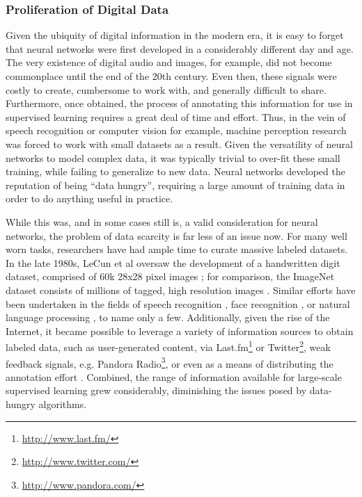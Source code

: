 \subsubsection{Proliferation of Digital Data}
\label{subsec:perceptrons}

Given the ubiquity of digital information in the modern era, it is easy to forget that neural networks were first developed in a considerably different day and age.
The very existence of digital audio and images, for example, did not become commonplace until the end of the 20th century.
Even then, these signals were costly to create, cumbersome to work with, and generally difficult to share.
Furthermore, once obtained, the process of annotating this information for use in supervised learning requires a great deal of time and effort.
Thus, in the vein of speech recognition or computer vision for example, machine perception research was forced to work with small datasets as a result.
Given the versatility of neural networks to model complex data, it was typically trivial to over-fit these small training, while failing to generalize to new data.
Neural networks developed the reputation of being ``data hungry'', requiring a large amount of training data in order to do anything useful in practice.

While this was, and in some cases still is, a valid consideration for neural networks, the problem of data scarcity is far less of an issue now.
For many well worn tasks, researchers have had ample time to curate massive labeled datasets.
In the late 1980s, LeCun et al oversaw the development of a handwritten digit dataset, comprised of 60k 28x28 pixel images \cite{LeCun1998MNIST};
for comparison, the ImageNet dataset consists of millions of tagged, high resolution images \cite{Deng2009Imagenet}.
Similar efforts have been undertaken in the fields of speech recognition \cite{Fisher1986TIMIT}, face recognition \cite{Huang2007Labeled}, or natural language processing \cite{Lewis2004RCV1}, to name only a few.
Additionally, given the rise of the Internet, it became possible to leverage a variety of information sources to obtain labeled data, such as user-generated content, via Last.fm\footnote{\url{http://www.last.fm/}} or Twitter\footnote{\url{http://www.twitter.com/}}, weak feedback signals, e.g. Pandora Radio\footnote{\url{http://www.pandora.com/}}, or even as a means of distributing the annotation effort \cite{Von2003Captcha}.
Combined, the range of information available for large-scale supervised learning grew considerably, diminishing the issues posed by data-hungry algorithms.

